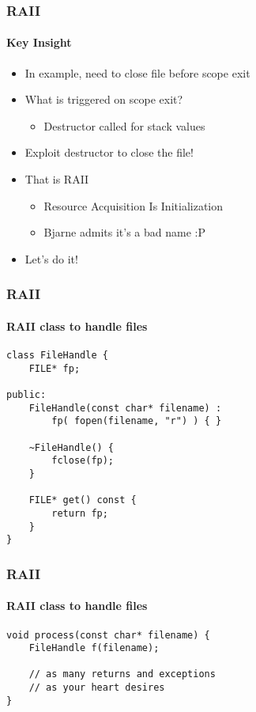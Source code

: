 \begin{frame}
    \frametitle{RAII}
    \framesubtitle{Key Insight}
    \begin{itemize}
        \item In example, need to close file before scope exit
        \item What is triggered on scope exit?
            \begin{itemize}
                \item Destructor called for stack values
            \end{itemize}
        \item Exploit destructor to close the file!
        \item That is RAII
            \begin{itemize}
                \item Resource Acquisition Is Initialization
                \item Bjarne admits it's a bad name :P
            \end{itemize}
        \item Let's do it!
    \end{itemize}
\end{frame}

\begin{frame}[fragile]
    \frametitle{RAII}
    \framesubtitle{RAII class to handle files}
    \begin{lstlisting}[title=Problems begone!]
class FileHandle {
    FILE* fp;

public:
    FileHandle(const char* filename) :
        fp( fopen(filename, "r") ) { }

    ~FileHandle() {
        fclose(fp);
    }

    FILE* get() const {
        return fp;
    }
}
    \end{lstlisting}
\end{frame}

\begin{frame}[fragile]
    \frametitle{RAII}
    \framesubtitle{RAII class to handle files}
    \begin{lstlisting}[title=Problems begone!]
void process(const char* filename) {
    FileHandle f(filename);

    // as many returns and exceptions
    // as your heart desires
}
    \end{lstlisting}
\end{frame}

